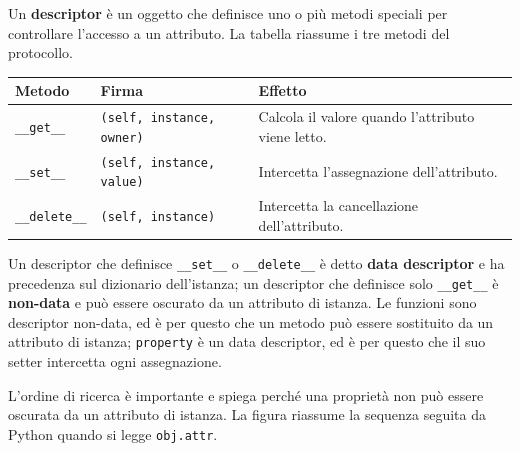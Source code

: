 \documentclass[12pt]{extarticle}
\begin{document}
\noindent Un \textbf{descriptor} è un oggetto che definisce uno o più metodi speciali per controllare l'accesso a un attributo. La tabella riassume i tre metodi del protocollo.

\begin{center}
\small
\begin{tabular}{p{3.6cm}p{5.2cm}p{5.6cm}}
    \toprule
    \textbf{Metodo} & \textbf{Firma} & \textbf{Effetto} \\
    \midrule
    \texttt{\_\_get\_\_} & \texttt{(self, instance, owner)} & Calcola il valore quando l'attributo viene letto. \\
    \addlinespace
    \texttt{\_\_set\_\_} & \texttt{(self, instance, value)} & Intercetta l'assegnazione dell'attributo. \\
    \addlinespace
    \texttt{\_\_delete\_\_} & \texttt{(self, instance)} & Intercetta la cancellazione dell'attributo. \\
    \bottomrule
\end{tabular}
\end{center}

\noindent Un descriptor che definisce \texttt{\_\_set\_\_} o \texttt{\_\_delete\_\_} è detto \textbf{data descriptor} e ha precedenza sul dizionario dell'istanza; un descriptor che definisce solo \texttt{\_\_get\_\_} è \textbf{non-data} e può essere oscurato da un attributo di istanza. Le funzioni sono descriptor non-data, ed è per questo che un metodo può essere sostituito da un attributo di istanza; \texttt{property} è un data descriptor, ed è per questo che il suo setter intercetta ogni assegnazione.

\noindent L'ordine di ricerca è importante e spiega perché una proprietà non può essere oscurata da un attributo di istanza. La figura riassume la sequenza seguita da Python quando si legge \texttt{obj.attr}.

\begin{center}
\end{center}
\end{document}

